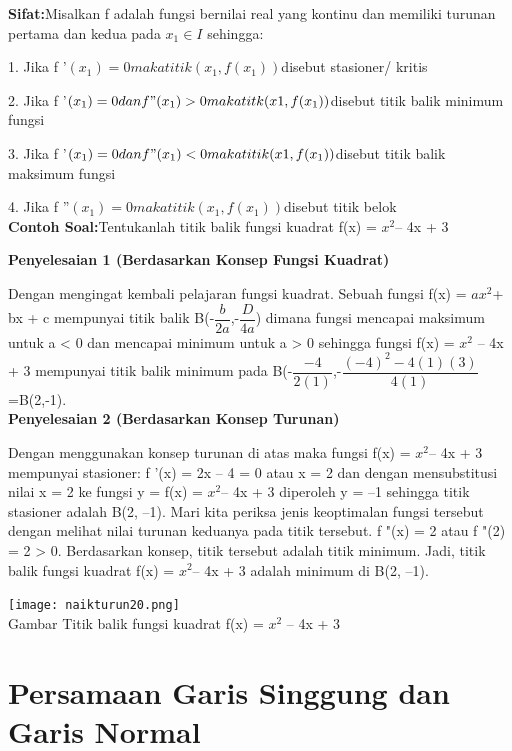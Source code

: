 \documentclass[11pt,fleqn]{book} %
\begin{document}
\textbf{Sifat:}Misalkan f adalah fungsi bernilai real yang kontinu
dan memiliki turunan pertama dan kedua pada $x_{1} \in I$
sehingga:

1. Jika f '$(x_{1}) = 0 maka titik (x_{1}, f(x_{1}))$disebut stasioner/
kritis

2. Jika f '$(x_{1}) = 0 dan f "(x_{1}) > 0 maka titk (x1, f(x_{1}))$disebut titik balik minimum fungsi

3. Jika f '$(x_{1}) = 0 dan f "(x_{1}) < 0 maka titik (x1, f(x_{1}))$disebut titik balik maksimum fungsi

4. Jika f ''$(x_{1}) = 0 maka titik (x_{1}, f(x_{1})) $disebut titik belok\\

\textbf{Contoh Soal:}Tentukanlah titik balik fungsi kuadrat f(x) = $x^{2} $– 4x + 3

\textbf{Penyelesaian 1 (Berdasarkan Konsep
Fungsi Kuadrat)}

Dengan mengingat kembali pelajaran fungsi kuadrat.
Sebuah fungsi f(x) = $ax^{2} $+ bx + c mempunyai titik balik B(-$\dfrac{b}{2a}$,-$\dfrac{D}{4a}$) dimana fungsi mencapai maksimum untuk a < 0 dan mencapai minimum untuk a > 0 sehingga fungsi
f(x) = $x^{2}$ – 4x + 3 mempunyai titik balik minimum pada B(-$\dfrac{-4}{2(1)}$,-$\dfrac{(-4)^{2}-4(1)(3)}{4(1)}$=B(2,-1).\\

\textbf{Penyelesaian 2 (Berdasarkan Konsep
Turunan)}

Dengan menggunakan konsep turunan di atas maka
fungsi f(x) = $x^{2} $– 4x + 3 mempunyai stasioner: f '(x) = 2x – 4 = 0 atau x = 2 dan dengan mensubstitusi nilai x = 2 ke fungsi y = f(x) = $x^{2} $– 4x + 3 diperoleh y = –1 sehingga titik stasioner adalah B(2, –1). Mari kita periksa jenis keoptimalan fungsi tersebut dengan melihat nilai turunan keduanya pada titik tersebut. f "(x) = 2 atau f "(2) = 2 > 0.
Berdasarkan konsep, titik tersebut adalah titik minimum. Jadi, titik balik fungsi kuadrat f(x) = $x^{2} $– 4x + 3 adalah minimum di B(2, –1).

\begin{center}
\texttt{[image: naikturun20.png]}\\
Gambar Titik balik fungsi kuadrat f(x) = $x^{2}$ – 4x + 3
\end{center}

\section{Persamaan Garis Singgung dan Garis Normal}
\end{document}
